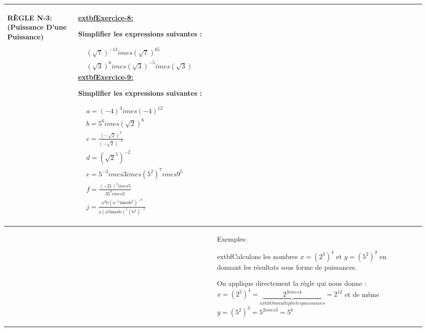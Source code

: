 \documentclass[11pt,a4paper,landscape]{article}
\begin{document}
\begin{longtable}{|>{\centering\arraybackslash}p{3cm}|>{\raggedright\arraybackslash}p{5cm}|>{\raggedright\arraybackslash}p{13.5cm}|>{\raggedright\arraybackslash}p{5cm}|}
\begin{BoxRafa}[colbacktitle = green]{RÈGLE N$\circ$3:(Puissance D’une Puissance)}
\begin{tikzpicture}[
roundnode/.style={circle, draw=green!60, fill=green!5, very thick, minimum size=7mm},
squarednode/.style={rectangle, draw=red!60, fill=red!5, very thick, minimum size=5mm},
]
\end{tikzpicture}\vspace{-.1cm}
\end{BoxRafa}

&
\colorbox{yellow!50!white}{\uline{\sffamily extbf{Exercice-8:}}}\par
Simplifier les expressions suivantes :

$\begin{aligned}&\left(\sqrt{7}\right)^{-13}imes\left(\sqrt{7}\right)^{65}\\&\left(\sqrt{3}\right)^{6}imes\left(\sqrt{3}\right)^{-5}imes\left(\sqrt{3}\right)\end{aligned}$
\colorbox{yellow!50!white}{\uline{\sffamily extbf{Exercice-9:}}}\par
Simplifier les expressions suivantes :

$\begin{aligned}
&a= (-4)^{3}imes(-4)^{12} \\
&b=5^{6}imes(\sqrt{2})^{6}  \\
&c= \frac{(-\sqrt{2})^{3}}{(-\sqrt{2})^{-8}} \\
&d=\left(\sqrt{2}^{5}\right)^{-2}  \\
&e= 5^{-3}imes3imes(5^{2})^{7}imes9^{5}  \\
&f= \frac{(-21)^{3}imes5}{35^{3}imes3}  \\
&j= \frac{\mathrm{a^{2}b(a^{-1}imes b^{2})^{-3}}}{\mathrm{a(a^{2}imes b)^{5}(b^{2})^{-1}}} 
\end{aligned}$
\\
\hline
&

&	
\vspace{.01cm}
\begin{BoxRafa}[colbacktitle = Orange]{Exemples:}

extbf{Calculons les nombres $x=\left(2^{3}\right)^{4}$ et $y=\left(5^{2}\right)^{3}$ en donnant les résultats sous forme de puissances.}

On applique directement la règle qui nous donne : $x=\left(2^3\right)^4=\underbrace{\qquad\quad2^{3imes4}\qquad\quad}_{extit{On multiplie les puissances}}=2^{12}$ et de même $y=\left(5^2\right)^3=5^{2imes3}=5^6$


\end{BoxRafa}
\end{longtable}
\end{document}
